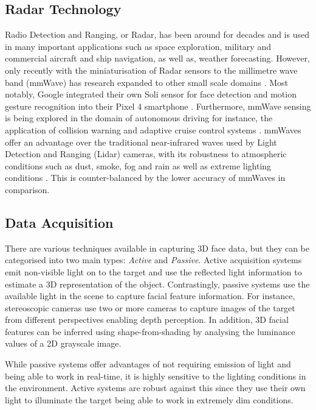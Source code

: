 \documentclass{interim}
\begin{document}
\subsection{Radar Technology}
Radio Detection and Ranging, or Radar, has been around for decades and is used in many important applications such as space exploration, military and commercial aircraft and ship navigation, as well as, weather forecasting. However, only recently with the miniaturisation of Radar sensors to the millimetre wave band (mmWave) has research expanded to other small scale domains \cite{soumya2023recent}. Most notably, Google integrated their own Soli sensor for face detection and motion gesture recognition into their Pixel 4 smartphone \cite{googleblog2020}. Furthermore, mmWave sensing is being explored in the domain of autonomous driving for instance, the application of collision warning and adaptive cruise control systems \cite{dfrobot}. mmWaves offer an advantage over the traditional near-infrared waves used by Light Detection and Ranging (Lidar) cameras, with its robustness to atmospheric conditions such as dust, smoke, fog and rain as well as extreme lighting conditions \cite{cadenceblog2022}. This is counter-balanced by the lower accuracy of mmWaves in comparison.


\subsection{Data Acquisition}
There are various techniques available in capturing 3D face data, but they can be categorised into two main types: \textit{Active} and \textit{Passive}. Active acquisition systems emit non-visible light on to the target and use the reflected light information to estimate a 3D representation of the object. Contrastingly, passive systems use the available light in the scene to capture facial feature information. For instance, stereoscopic cameras use two or more cameras to capture images of the target from different perspectives enabling depth perception. In addition, 3D facial features can be inferred using shape-from-shading by analysing the luminance values of a 2D grayscale image. 

While passive systems offer advantages of not requiring emission of light and being able to work in real-time, it is highly sensitive to the lighting conditions in the environment. Active systems are robust against this since they use their own light to illuminate the target being able to work in extremely dim conditions. 
\end{document}
